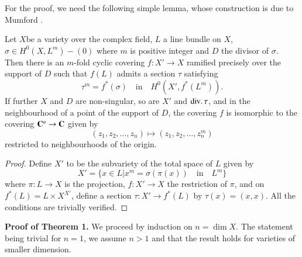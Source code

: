 For the proof, we need the following simple lemma, whose construction is due to Mumford \cite{art9-key7}.

\begin{lem}\label{art9-lem1}%
Let $X$\pageoriginale be a variety over the complex field, $L$ a line bundle on $X$, $\sigma \in H^0(X, L^m) -(0)$ where $m$ is positive integer and $D$ the divisor of $\sigma$. Then there is an $m$-fold cyclic covering $f: X' \to X$ ramified precisely over the support of $D$ such that $f(L)$ admits a section $\tau$ satisfying
$$
\tau^m = f^* (\sigma) \text{~~ in ~~} H^0 (X', f^* (L^m)).
$$
If further $X$ and $D$ are non-singular, so are $X'$ and $\operatorname{div} \ldotp\tau$, and in the neighbourhood of a point of the support of $D$, the covering $f$ is isomorphic to the covering $\mathbf{C}^n \to \mathbf{C}$ given by
$$
(z_1, z_2, \ldots, z_n) \longmapsto (z_1, z_2, \ldots, z^m_n)
$$
restricted to neighbourhoods of the origin.
\end{lem}

\begin{proof}
Define $X'$ to be the subvariety of the total space of $L$ given by
$$
X' = \{x \in L | x^m = \sigma (\pi (x)) \text{~~ in ~~} L^m \}
$$
where $\pi: L \to X$ is the projection, $f : X' \to X$ the restriction of $\pi$, and on $f^* (L) = L \times X^{X'}$, define a section $\tau: X' \to f^* (L)$ by $\tau (x) = (x,x)$. All the conditions are trivially verified.
\end{proof}

\noindent
{\bf Proof of Theorem 1.} We proceed by induction on $n = \dim X$. The statement being trivial for $n=1$, we assume $n>1$ and that the result holds for varieties of smaller dimension.

